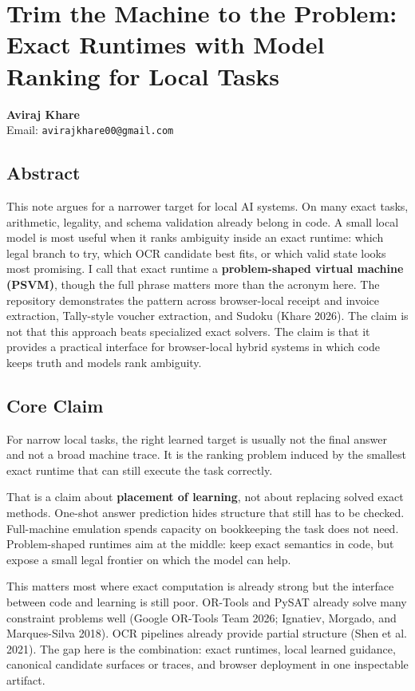 \documentclass[
]{article}
\author{}
\date{}
\begin{document}
\section{Trim the Machine to the Problem: Exact Runtimes with Model
Ranking for Local
Tasks}\label{trim-the-machine-to-the-problem-exact-runtimes-with-model-ranking-for-local-tasks}

\textbf{Aviraj Khare}\\
Email: \texttt{avirajkhare00@gmail.com}

\subsection{Abstract}\label{abstract}

This note argues for a narrower target for local AI systems. On many
exact tasks, arithmetic, legality, and schema validation already belong
in code. A small local model is most useful when it ranks ambiguity
inside an exact runtime: which legal branch to try, which OCR candidate
best fits, or which valid state looks most promising. I call that exact
runtime a \textbf{problem-shaped virtual machine (PSVM)}, though the
full phrase matters more than the acronym here. The repository
demonstrates the pattern across browser-local receipt and invoice
extraction, Tally-style voucher extraction, and Sudoku (Khare 2026). The
claim is not that this approach beats specialized exact solvers. The
claim is that it provides a practical interface for browser-local hybrid
systems in which code keeps truth and models rank ambiguity.

\subsection{Core Claim}\label{core-claim}

For narrow local tasks, the right learned target is usually not the
final answer and not a broad machine trace. It is the ranking problem
induced by the smallest exact runtime that can still execute the task
correctly.

That is a claim about \textbf{placement of learning}, not about
replacing solved exact methods. One-shot answer prediction hides
structure that still has to be checked. Full-machine emulation spends
capacity on bookkeeping the task does not need. Problem-shaped runtimes
aim at the middle: keep exact semantics in code, but expose a small
legal frontier on which the model can help.

This matters most where exact computation is already strong but the
interface between code and learning is still poor. OR-Tools and PySAT
already solve many constraint problems well (Google OR-Tools Team 2026;
Ignatiev, Morgado, and Marques-Silva 2018). OCR pipelines already
provide partial structure (Shen et al. 2021). The gap here is the
combination: exact runtimes, local learned guidance, canonical candidate
surfaces or traces, and browser deployment in one inspectable artifact.
\end{document}
